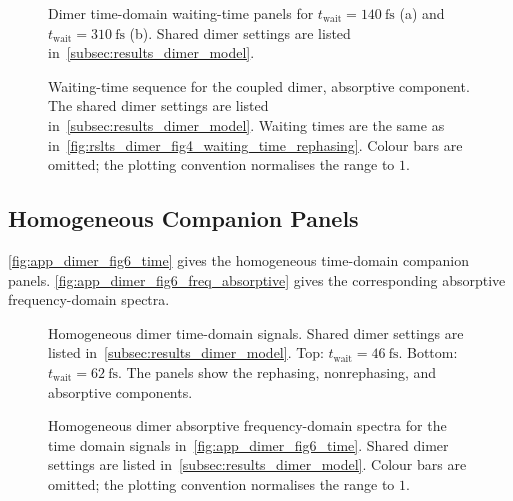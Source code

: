 \begin{figure}[htbp]
    \centering
    \caption{Dimer time-domain waiting-time panels for
    \(t_{\mathrm{wait}}=\SI{140}{\femto\second}\) (a) and
    \(t_{\mathrm{wait}}=\SI{310}{\femto\second}\) (b). Shared dimer settings
    are listed in~\autoref{subsec:results_dimer_model}.}
    \label{fig:app_dimer_fig4_time_t140_t310}
\end{figure}

\begin{figure}[htbp]
    \centering
    \caption{Waiting-time sequence for the coupled dimer, absorptive component.
    The shared dimer settings are listed in~\autoref{subsec:results_dimer_model}.
    Waiting times are the same as
    in~\autoref{fig:rslts_dimer_fig4_waiting_time_rephasing}. Colour bars are
    omitted; the plotting convention normalises the range to \(1\).}
    \label{fig:rslts_dimer_fig4_waiting_time_absorptive}
\end{figure}

\subsection{Homogeneous Companion Panels}
\autoref{fig:app_dimer_fig6_time} gives the homogeneous time-domain companion
panels. \autoref{fig:app_dimer_fig6_freq_absorptive} gives the corresponding
absorptive frequency-domain spectra.

\begin{figure}[htbp]
    \centering
    \caption{Homogeneous dimer time-domain signals. Shared dimer settings are
    listed in~\autoref{subsec:results_dimer_model}. Top:
    \(t_{\mathrm{wait}}=\SI{46}{\femto\second}\). Bottom:
    \(t_{\mathrm{wait}}=\SI{62}{\femto\second}\). The panels show the rephasing,
    nonrephasing, and absorptive components.}
    \label{fig:app_dimer_fig6_time}
\end{figure}

\begin{figure}[htbp]
    \centering
    \caption{Homogeneous dimer absorptive frequency-domain spectra
    for the time domain signals in~\autoref{fig:app_dimer_fig6_time}. Shared dimer
    settings are listed in~\autoref{subsec:results_dimer_model}. Colour bars
    are omitted; the plotting convention normalises the range to \(1\).}
    \label{fig:app_dimer_fig6_freq_absorptive}
\end{figure}

